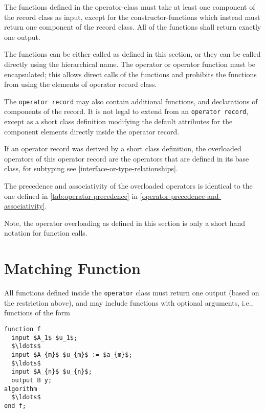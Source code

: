 The functions defined in the operator-class must take at least one component of the record class as input, except for the constructor-functions which instead must return one component of the record class.
All of the functions shall return exactly one output.

The functions can be either called as defined in this section, or they can be called directly using the hierarchical name.
The operator or operator function must be encapsulated; this allows direct calls of the functions and prohibits the functions from using the elements of operator record class.

The \lstinline!operator record! may also contain additional functions, and declarations of components of the record.
It is not legal to extend from an \lstinline!operator record!, except as a short class definition modifying the default attributes for the component elements directly inside the operator record.

If an operator record was derived by a short class definition, the overloaded operators of this operator record are the operators that are defined in its base class, for subtyping see \cref{interface-or-type-relationships}.

The precedence and associativity of the overloaded operators is identical to the one defined in \cref{tab:operator-precedence} in \cref{operator-precedence-and-associativity}.

\begin{nonnormative}
Note, the operator overloading as defined in this section is only a short hand notation for function calls.
\end{nonnormative}

\section{Matching Function}\label{matching-function}

All functions defined inside the \lstinline!operator! class must return one output (based on the restriction above), and may include functions with optional arguments, i.e., functions of the form
\begin{lstlisting}[language=modelica]
function f
  input $A_1$ $u_1$;
  $\ldots$
  input $A_{m}$ $u_{m}$ := $a_{m}$;
  $\ldots$
  input $A_{n}$ $u_{n}$;
  output B y;
algorithm
  $\ldots$
end f;
\end{lstlisting}

